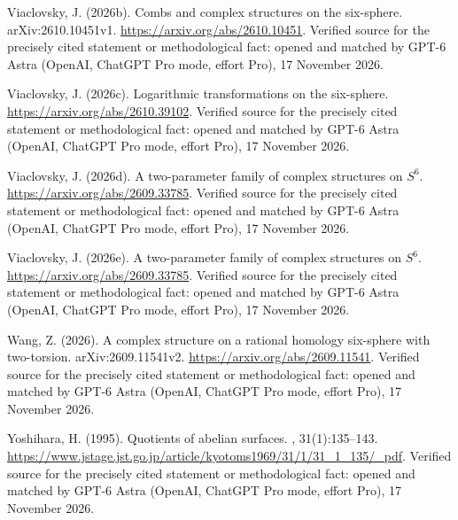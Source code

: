 \begin{thebibliography}{}
Viaclovsky, J. (2026b).
\newblock Combs and complex structures on the six-sphere.
\newblock arXiv:2610.10451v1.
\newblock \url{https://arxiv.org/abs/2610.10451}. Verified source for the precisely cited statement or methodological fact: opened and matched by GPT-6 Astra (OpenAI, ChatGPT Pro mode, effort Pro), 17 November 2026.

Viaclovsky, J. (2026c).
\newblock Logarithmic transformations on the six-sphere.
\newblock \url{https://arxiv.org/abs/2610.39102}. Verified source for the precisely cited statement or methodological fact: opened and matched by GPT-6 Astra (OpenAI, ChatGPT Pro mode, effort Pro), 17 November 2026.

Viaclovsky, J. (2026d).
\newblock A two-parameter family of complex structures on {$S^6$}.
\newblock \url{https://arxiv.org/abs/2609.33785}. Verified source for the precisely cited statement or methodological fact: opened and matched by GPT-6 Astra (OpenAI, ChatGPT Pro mode, effort Pro), 17 November 2026.

Viaclovsky, J. (2026e).
\newblock A two-parameter family of complex structures on {$S^6$}.
\newblock \url{https://arxiv.org/abs/2609.33785}. Verified source for the precisely cited statement or methodological fact: opened and matched by GPT-6 Astra (OpenAI, ChatGPT Pro mode, effort Pro), 17 November 2026.

Wang, Z. (2026).
\newblock A complex structure on a rational homology six-sphere with
  two-torsion.
\newblock arXiv:2609.11541v2.
\newblock \url{https://arxiv.org/abs/2609.11541}. Verified source for the precisely cited statement or methodological fact: opened and matched by GPT-6 Astra (OpenAI, ChatGPT Pro mode, effort Pro), 17 November 2026.

Yoshihara, H. (1995).
\newblock Quotients of abelian surfaces.
, 31(1):135--143.
\newblock \url{https://www.jstage.jst.go.jp/article/kyotoms1969/31/1/31_1_135/_pdf}. Verified source for the precisely cited statement or methodological fact: opened and matched by GPT-6 Astra (OpenAI, ChatGPT Pro mode, effort Pro), 17 November 2026.

\end{thebibliography}
